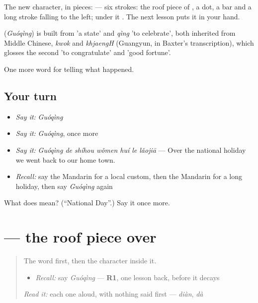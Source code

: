The new character, in pieces:  — six strokes: the roof piece of , a dot, a bar and a long stroke falling to the left; under it . The next lesson puts it in your hand.

\begin{cousinweb}
\textbf{} (\emph{Guóqìng}) is built from  'a state' and \emph{qìng} 'to celebrate', both inherited from Middle Chinese, \emph{kwok} and \emph{khjaengH} (Guangyun, in Baxter's transcription), which glosses the second 'to congratulate' and 'good fortune'.
\end{cousinweb}

\begin{grammarlens}[title={What you've built}]
One more word for telling what happened.
\end{grammarlens}

\subsection*{Your turn}
\begin{itemize}
\raggedright
  \item \emph{Say it:} \emph{Guóqìng}
  \item \emph{Say it:} \emph{Guóqìng}, once more
  \item \emph{Say it:} \emph{Guóqìng de shíhou wǒmen huí le lǎojiā} — Over the national holiday we went back to our home town.
  \item \emph{Recall:} say the Mandarin for a local custom, then the Mandarin for a long holiday, then say \emph{Guóqìng} again
\end{itemize}

\begin{tcolorbox}[breakable,colback=teal!4,colframe=teal!35!black,title={Before you move on}]
What does  mean? (\textquotedblleft{}National Day\textquotedblright{}.) Say it once more.
\end{tcolorbox}
\section[\texorpdfstring{\zh{庆} (qìng)}{庆 (qìng)}]{ — the roof piece over }

\label{lesson:ZH-W339-qing-celebrate}



\begin{quote}
The word first, then the character inside it.

\begin{itemize}
\raggedright
  \item \emph{Recall:} say \emph{Guóqìng} — \textbf{R1}, one lesson back, before it decays
\end{itemize}

\begin{quote}
 
\end{quote}

\emph{Read it:} each one aloud, with nothing said first — \emph{diàn}, \emph{dà}
\end{quote}

